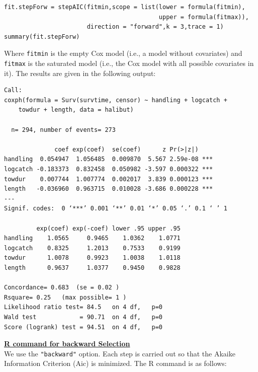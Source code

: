 \documentclass[11pt]{book}
\begin{document}
\small
\begin{verbatim}
fit.stepForw = stepAIC(fitmin,scope = list(lower = formula(fitmin),
                                           upper = formula(fitmax)),
                       direction = "forward",k = 3,trace = 1)
summary(fit.stepForw)
\end{verbatim}
\normalsize
Where {\tt fitmin} is the empty Cox model (i.e., a model without covariates) and {\tt fitmax} is the saturated model (i.e., the Cox model with all possible covariates in it).
\newpage
\noindent
The results are given in the following output:

\small
\begin{verbatim}
Call:
coxph(formula = Surv(survtime, censor) ~ handling + logcatch +
    towdur + length, data = halibut)

  n= 294, number of events= 273

              coef exp(coef)  se(coef)      z Pr(>|z|)
handling  0.054947  1.056485  0.009870  5.567 2.59e-08 ***
logcatch -0.183373  0.832458  0.050982 -3.597 0.000322 ***
towdur    0.007744  1.007774  0.002017  3.839 0.000123 ***
length   -0.036960  0.963715  0.010028 -3.686 0.000228 ***
---
Signif. codes:  0 ‘***’ 0.001 ‘**’ 0.01 ‘*’ 0.05 ‘.’ 0.1 ‘ ’ 1

         exp(coef) exp(-coef) lower .95 upper .95
handling    1.0565     0.9465    1.0362    1.0771
logcatch    0.8325     1.2013    0.7533    0.9199
towdur      1.0078     0.9923    1.0038    1.0118
length      0.9637     1.0377    0.9450    0.9828

Concordance= 0.683  (se = 0.02 )
Rsquare= 0.25   (max possible= 1 )
Likelihood ratio test= 84.5   on 4 df,   p=0
Wald test            = 90.71  on 4 df,   p=0
Score (logrank) test = 94.51  on 4 df,   p=0

\end{verbatim}
\normalsize
\noindent\underline{\bf R command for backward Selection}
\\[2ex]
We use the {\tt "backward"} option. Each step is carried out so that the Akaike Information Criterion (Aic) is minimized.  The R command is as follows:
\end{document}
